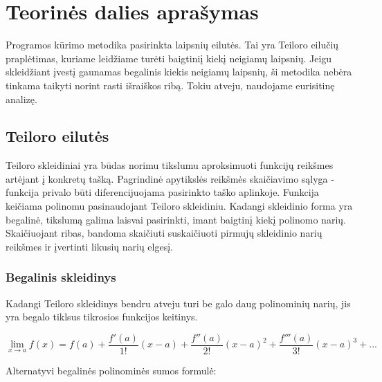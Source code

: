 \section{Teorinės dalies aprašymas}






Programos kūrimo metodika pasirinkta laipsnių eilutės. 
Tai yra Teiloro eilučių praplėtimas, kuriame leidžiame turėti baigtiniį kiekį neigiamų laipsnių. 
Jeigu skleidžiant įvestį gaunamas begalinis kiekis neigiamų laipsnių, ši metodika nebėra tinkama taikyti norint rasti išraiškos ribą.
Tokiu atveju, naudojame eurisitinę analizę. 

\subsection{Teiloro eilutės}

	Teiloro skleidiniai yra būdas norimu tikslumu aproksimuoti funkcijų reikšmes artėjant į konkretų tašką.
	Pagrindinė apytikslės reikšmės skaičiavimo sąlyga - funkcija privalo būti diferencijuojama pasirinkto taško aplinkoje.
	Funkcija keičiama polinomu pasinaudojant Teiloro skleidiniu.
	Kadangi skleidinio forma yra begalinė, tikslumą galima laisvai pasirinkti, imant baigtinį kiekį polinomo narių. 
	Skaičiuojant ribas, bandoma skaičiuti suskaičiuoti pirmujų skleidinio narių reikšmes ir įvertinti likusių narių elgesį. 

	\subsubsection*{Begalinis skleidinys}
		Kadangi Teiloro skleidinys bendru atveju turi be galo daug polinominių narių, jis yra begalo tiklsus tikrosios funkcijos keitinys.

		\[\lim_{x \to a} f(x) = f(a) + \frac{f'(a)}{1!}(x-a)+\frac{f''(a)}{2!}(x-a)^2 + \frac{f'''(a)}{3!}(x-a)^3 + ...\]
		
		Alternatyvi begalinės polinominės sumos formulė:

